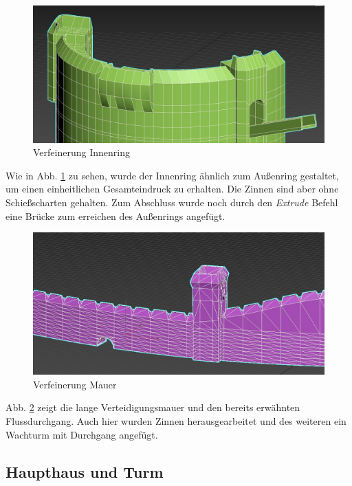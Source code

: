 \begin{figure}[h]
	\centering
	\includegraphics[width=0.95 \linewidth]{Abbildungen/3dsMax/Innenring}
	\caption{Verfeinerung Innenring}
	\label{fig:Innenring}
\end{figure}

Wie in Abb. \ref{fig:Innenring} zu sehen, wurde der Innenring ähnlich zum Außenring gestaltet, um einen einheitlichen Gesamteindruck zu erhalten. Die Zinnen sind aber ohne Schießscharten gehalten. Zum Abschluss wurde noch durch den \textit{Extrude} Befehl eine Brücke zum erreichen des Außenrings angefügt.

\begin{figure}[h]
	\centering
	\includegraphics[width=0.95 \linewidth]{Abbildungen/3dsMax/Mauer}
	\caption{Verfeinerung Mauer}
	\label{fig:Mauer}
\end{figure}

Abb. \ref{fig:Mauer} zeigt die lange Verteidigungsmauer und den bereits erwähnten Flussdurchgang. Auch hier wurden Zinnen herausgearbeitet und des weiteren ein Wachturm mit Durchgang angefügt.
\newpage

\subsection{Haupthaus und Turm}

